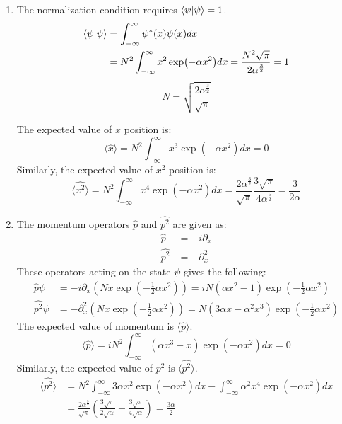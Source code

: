 \begin{sol}
\begin{enumerate}[label=\textbf{(\alph*)}]
	\item The normalization condition requires $\braket{\psi}{\psi}=1$.
	\begin{equation}
		\begin{aligned}
			\braket{\psi}{\psi}&=\int_{-\infty}^{\infty}\psi^*(x)\psi(x) dx\\
			&=N^2\int_{-\infty}^{\infty}x^2\exp(-\alpha x^2)dx=\frac{N^2\sqrt\pi}{2\alpha^\frac{3}{2}}=1\\
		\end{aligned}
	\end{equation}
	\begin{equation}
		N=\sqrt{\frac{2\alpha^\frac{3}{2}}{\sqrt{\pi}}}
	\end{equation}
	
	
	The expected value of $x$ position is:
	\begin{equation}
		\langle\hat{x}\rangle=N^2\int_{-\infty}^{\infty}x^3\exp(-\alpha x^2)dx=0
	\end{equation}
	Similarly, the expected value of $x^2$ position is:
	\begin{equation}
		\langle\hat{x^2}\rangle=N^2\int_{-\infty}^{\infty}x^4\exp(-\alpha x^2)dx=\frac{2\alpha^\frac{3}{2}}{\sqrt{\pi}}\frac{3\sqrt{\pi}}{4\alpha^\frac{5}{2}}=\frac{3}{2\alpha}
	\end{equation}
	
	\item The momentum operators $\hat{p}$ and $\hat{p^2}$ are given as:
	\begin{align}
		\hat{p}&=-i\partial_x\\
		\hat{p^2}&=-\partial_x^2
	\end{align}
	These operators acting on the state $\psi$ gives the following:
	\begin{align} 
		\hat{p}\psi&=-i\partial_x\left(Nx\exp(-\frac{1}{2}\alpha x^2)\right)=
	iN(\alpha x^2-1)\exp(-\frac{1}{2}\alpha x^2)\\
	\hat{p^2}\psi&=-\partial_x^2\left(Nx\exp(-\frac{1}{2}\alpha x^2)\right)=
	N(3\alpha x - \alpha^2x^3)\exp(-\frac{1}{2}\alpha x^2)
	\end{align}
	The expected value of momentum is $\langle\hat{p}\rangle$.
	\begin{equation}
		\langle\hat{p}\rangle=iN^2\int_{-\infty}^{\infty}(\alpha x^3-x)\exp(-\alpha x^2)dx=0
	\end{equation}
	Similarly, the expected value of $p^2$ is $\langle\hat{p^2}\rangle$.
	\begin{equation}
		\begin{aligned}
			\langle\hat{p^2}\rangle&=N^2\int_{-\infty}^{\infty}3\alpha x^2 \exp(-\alpha x^2)dx-
		\int_{-\infty}^{\infty}\alpha^2 x^4 \exp(-\alpha x^2)dx\\&=\frac{2\alpha^\frac{3}{2}}{\sqrt{\pi}}
		\left(\frac{3\sqrt\pi}{2\sqrt\alpha}-\frac{3\sqrt{\pi}}{4\sqrt{\alpha}}\right)
		=\frac{3\alpha}{2}
		\end{aligned}
	\end{equation}
	

\end{enumerate}
\end{sol}
